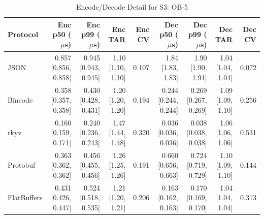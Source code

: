 \begin{table}[htbp]
\centering
\caption{Encode/Decode Detail for S3: OB-5}
\label{tab:detail_book_small}
\begin{tabular}{l r r r r r r r r}
\hline
Protocol & Enc p50 ($\mu$s) & Enc p99 ($\mu$s) & Enc TAR & Enc CV & Dec p50 ($\mu$s) & Dec p99 ($\mu$s) & Dec TAR & Dec CV \\
\hline
  JSON & 0.857 [0.856, 0.858] & 0.945 [0.943, 0.945] & 1.10 [1.10, 1.10] & 0.107 & 1.84 [1.83, 1.83] & 1.90 [1.90, 1.91] & 1.04 [1.04, 1.04] & 0.072 \\
  Bincode & 0.358 [0.357, 0.358] & 0.430 [0.428, 0.431] & 1.20 [1.20, 1.20] & 0.194 & 0.244 [0.244, 0.244] & 0.269 [0.267, 0.269] & 1.09 [1.09, 1.10] & 0.256 \\
  rkyv & 0.160 [0.159, 0.171] & 0.240 [0.236, 0.243] & 1.47 [1.44, 1.48] & 0.320 & 0.036 [0.036, 0.036] & 0.038 [0.038, 0.038] & 1.06 [1.06, 1.06] & 0.531 \\
  Protobuf & 0.363 [0.362, 0.362] & 0.456 [0.455, 0.456] & 1.26 [1.25, 1.26] & 0.191 & 0.660 [0.656, 0.663] & 0.724 [0.719, 0.729] & 1.10 [1.09, 1.10] & 0.144 \\
  FlatBuffers & 0.431 [0.426, 0.447] & 0.524 [0.518, 0.535] & 1.21 [1.20, 1.21] & 0.206 & 0.163 [0.162, 0.163] & 0.170 [0.169, 0.170] & 1.04 [1.04, 1.04] & 0.313 \\
\hline
\end{tabular}
\end{table}